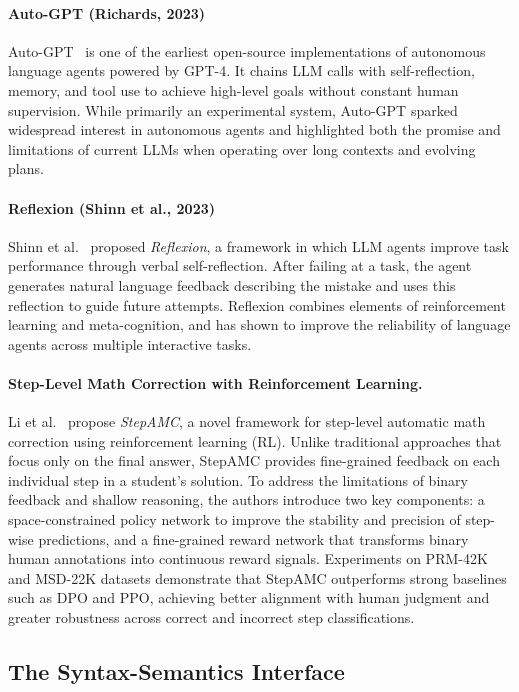 \paragraph{Auto-GPT (Richards, 2023)}  
Auto-GPT~\cite{torantulino2023autogpt} is one of the earliest open-source implementations of autonomous language agents powered by GPT-4. It chains LLM calls with self-reflection, memory, and tool use to achieve high-level goals without constant human supervision. While primarily an experimental system, Auto-GPT sparked widespread interest in autonomous agents and highlighted both the promise and limitations of current LLMs when operating over long contexts and evolving plans.

\paragraph{Reflexion (Shinn et al., 2023)}  
Shinn et al.~\cite{shinn2023reflexion} proposed \emph{Reflexion}, a framework in which LLM agents improve task performance through verbal self-reflection. After failing at a task, the agent generates natural language feedback describing the mistake and uses this reflection to guide future attempts. Reflexion combines elements of reinforcement learning and meta-cognition, and has shown to improve the reliability of language agents across multiple interactive tasks.

\paragraph{Step-Level Math Correction with Reinforcement Learning.}
Li et al.~\cite{li2025stepamc} propose \textit{StepAMC}, a novel framework for step-level automatic math correction using reinforcement learning (RL). Unlike traditional approaches that focus only on the final answer, StepAMC provides fine-grained feedback on each individual step in a student's solution. To address the limitations of binary feedback and shallow reasoning, the authors introduce two key components: a space-constrained policy network to improve the stability and precision of step-wise predictions, and a fine-grained reward network that transforms binary human annotations into continuous reward signals. Experiments on PRM-42K and MSD-22K datasets demonstrate that StepAMC outperforms strong baselines such as DPO and PPO, achieving better alignment with human judgment and greater robustness across correct and incorrect step classifications.


\subsection{The Syntax-Semantics Interface}
